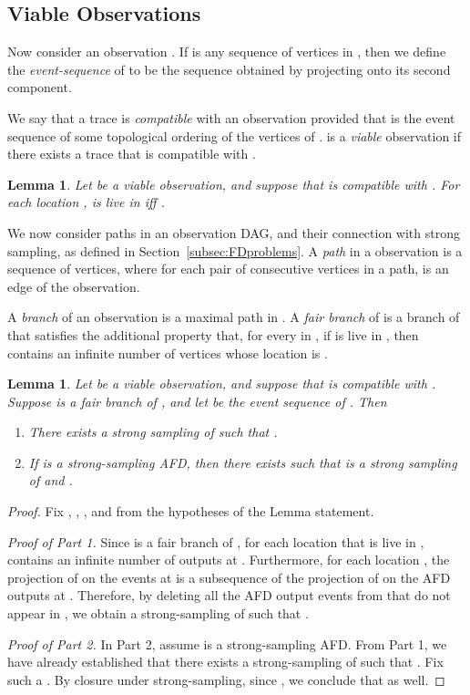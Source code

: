 \documentclass[11pt]{article}
\numberwithin{theorem}{section}
\newtheorem{lemma}[theorem]{Lemma}
\begin{document}
\subsection{Viable Observations}

Now consider an observation . 
If  is any sequence of vertices in , then we define
the \emph{event-sequence} of  to be the sequence obtained
by projecting  onto its second component.

We say that a trace  is \emph{compatible} with an
observation  provided that  is the event sequence of some
topological ordering of the vertices of .  
 is a \emph{viable} observation if there exists a trace 
that is compatible with .

\begin{lemma}
\label{prop:liveInObsAndTrace}
Let  be a viable observation, and suppose that  is
compatible with . 
For each location ,  is live in  iff .
\end{lemma}

We now consider paths in an observation DAG, and their connection with
strong sampling, as defined in Section~\ref{subsec:FDproblems}. A \emph{path} in a observation is a sequence of vertices, where for each pair of consecutive vertices  in a path,  is an edge of the observation.


A \emph{branch} of an observation  is a maximal path in .
A \emph{fair branch}  of  is a branch of  that satisfies the
additional property that, for every  in , if  is live in , then
 contains an infinite number of vertices whose location is .


\begin{lemma}
\label{prop:sampledSubsequence}
\label{prop:pathIsTrace}
Let  be a viable observation, and suppose that  is
compatible with . 
Suppose  is a fair branch of , and let  be the event
sequence of . 
Then
\begin{enumerate}
\item
There exists a strong sampling  of  such that
. 
\item
If  is a strong-sampling AFD, then there exists  
such that  is a strong sampling of  and .
\end{enumerate}
\end{lemma}
\begin{proof}
Fix , , ,  and  from the hypotheses of the Lemma statement.
 
\emph{Proof of Part 1.}
Since  is a fair branch of , for each location  that is live in ,  contains an infinite number of outputs at . Furthermore, for each location , the projection of  on the events at  is a subsequence of the projection of  on the AFD outputs at . Therefore, by deleting all the AFD output events from  that do not appear in , we obtain a strong-sampling  of  such that .

\emph{Proof of Part 2.}
In Part 2, assume  is a strong-sampling AFD. From Part 1, we have already established that there exists a strong-sampling  of  such that . Fix such a . By closure under strong-sampling, since , we conclude that  as well.
\end{proof}
\end{document}

